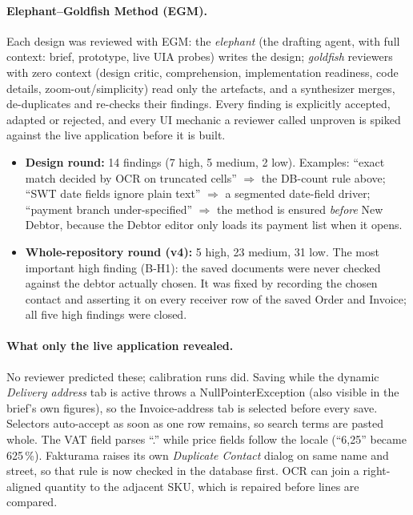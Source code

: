 \documentclass[11pt,a4paper]{article}
\begin{document}
\paragraph{Elephant--Goldfish Method (EGM).} Each design was reviewed with EGM: the \emph{elephant} (the drafting agent,
with full context: brief, prototype, live UIA probes) writes the design; \emph{goldfish} reviewers with zero context
(design critic, comprehension, implementation readiness, code details, zoom-out/simplicity) read only the artefacts, and a
synthesizer merges, de-duplicates and re-checks their findings. Every finding is explicitly accepted, adapted or rejected,
and every UI mechanic a reviewer called unproven is spiked against the live application before it is built.
\begin{itemize}
  \item \textbf{Design round:} 14 findings (7 high, 5 medium, 2 low). Examples: ``exact match decided by OCR on truncated
        cells'' $\Rightarrow$ the DB-count rule above; ``SWT date fields ignore plain text'' $\Rightarrow$ a segmented
        date-field driver; ``payment branch under-specified'' $\Rightarrow$ the method is ensured \emph{before} New Debtor,
        because the Debtor editor only loads its payment list when it opens.
  \item \textbf{Whole-repository round (v4):} 5 high, 23 medium, 31 low. The most important high finding (B-H1): the saved
        documents were never checked against the debtor actually chosen. It was fixed by recording the chosen contact and
        asserting it on every receiver row of the saved Order and Invoice; all five high findings were closed.
\end{itemize}

\paragraph{What only the live application revealed.} No reviewer predicted these; calibration runs did. Saving while the
dynamic \emph{Delivery address} tab is active throws a NullPointerException (also visible in the brief's own figures), so
the Invoice-address tab is selected before every save. Selectors auto-accept as soon as one row remains, so search terms
are pasted whole. The VAT field parses ``.'' while price fields follow the locale (``6,25'' became 625\,\%). Fakturama
raises its own \emph{Duplicate Contact} dialog on same name and street, so that rule is now checked in the database first.
OCR can join a right-aligned quantity to the adjacent SKU, which is repaired before lines are compared.
\end{document}
